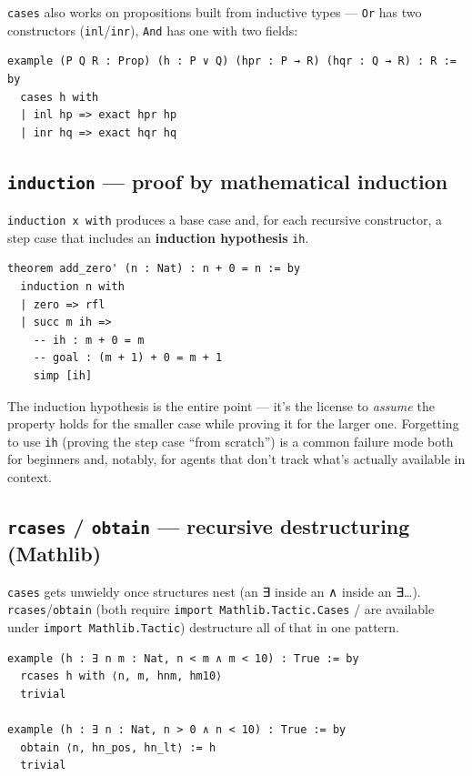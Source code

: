 \texttt{cases} also works on propositions built from inductive types --- \texttt{Or} has two constructors (\texttt{inl}/\texttt{inr}), \texttt{And} has one with two fields:

\begin{verbatim}
example (P Q R : Prop) (h : P ∨ Q) (hpr : P → R) (hqr : Q → R) : R := by
  cases h with
  | inl hp => exact hpr hp
  | inr hq => exact hqr hq
\end{verbatim}

\subsection{\texttt{induction} --- proof by mathematical induction}

\texttt{induction x with} produces a base case and, for each recursive constructor, a step case that includes an \textbf{induction hypothesis} \texttt{ih}.

\begin{verbatim}
theorem add_zero' (n : Nat) : n + 0 = n := by
  induction n with
  | zero => rfl
  | succ m ih =>
    -- ih : m + 0 = m
    -- goal : (m + 1) + 0 = m + 1
    simp [ih]
\end{verbatim}

The induction hypothesis is the entire point --- it's the license to \emph{assume} the property holds for the smaller case while proving it for the larger one. Forgetting to use \texttt{ih} (proving the step case ``from scratch'') is a common failure mode both for beginners and, notably, for agents that don't track what's actually available in context.

\subsection{\texttt{rcases} / \texttt{obtain} --- recursive destructuring (Mathlib)}

\texttt{cases} gets unwieldy once structures nest (an ∃ inside an ∧ inside an ∃\ldots). \texttt{rcases}/\texttt{obtain} (both require \texttt{import Mathlib.Tactic.Cases} / are available under \texttt{import Mathlib.Tactic}) destructure all of that in one pattern.

\begin{verbatim}
example (h : ∃ n m : Nat, n < m ∧ m < 10) : True := by
  rcases h with ⟨n, m, hnm, hm10⟩
  trivial

example (h : ∃ n : Nat, n > 0 ∧ n < 10) : True := by
  obtain ⟨n, hn_pos, hn_lt⟩ := h
  trivial
\end{verbatim}

